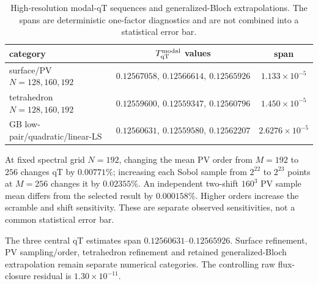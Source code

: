 \documentclass[10pt,aps,pre,onecolumn,notitlepage,nofootinbib]{revtex4-2}
\newcommand{\qT}{\mathrm{qT}}
\begin{document}
\begin{table}[htbp]
\caption{High-resolution modal-qT sequences and generalized-Bloch extrapolations. The spans are deterministic one-factor diagnostics and are not combined into a statistical error bar.}
\begin{ruledtabular}\begin{tabular}{lcc}
category & $T_{\qT}^{\rm modal}$ values & span\\\hline
surface/PV $N=128,160,192$ & $0.12567058,\ 0.12566614,\ 0.12565926$ & $1.133\times10^{-5}$\\
tetrahedron $N=128,160,192$ & $0.12559600,\ 0.12559347,\ 0.12560796$ & $1.450\times10^{-5}$\\
GB low-pair/quadratic/linear-LS & $0.12560631,\ 0.12559580,\ 0.12562207$ & $2.6276\times10^{-5}$\\
\end{tabular}\end{ruledtabular}
\end{table}
At fixed spectral grid $N=192$, changing the mean PV order from $M=192$ to $256$ changes qT by $0.00771\%$; increasing each Sobol sample from $2^{22}$ to $2^{23}$ points at $M=256$ changes it by $0.02355\%$. An independent two-shift $160^3$ PV sample mean differs from the selected result by $0.000158\%$. Higher orders increase the scramble and shift sensitivity. These are separate observed sensitivities, not a common statistical error bar.

The three central qT estimates span $0.12560631$--$0.12565926$. Surface refinement, PV sampling/order, tetrahedron refinement and retained generalized-Bloch extrapolation remain separate numerical categories. The controlling raw flux-closure residual is $1.30\times10^{-11}$.
\end{document}
